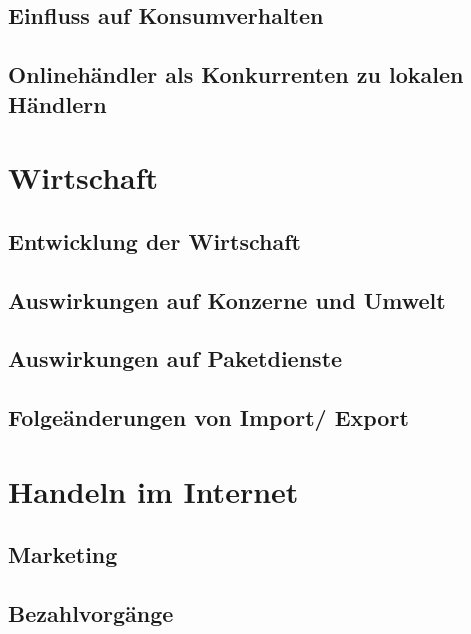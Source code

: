 \documentclass[a4paper, 12pt]{scrartcl}
\begin{document}
        \subsection{Einfluss auf Konsumverhalten }
            
            
        \subsection{Onlinehändler als Konkurrenten zu lokalen Händlern}
            
            
        
    \section{Wirtschaft}
        \subsection{Entwicklung der Wirtschaft}
        \subsection{Auswirkungen auf Konzerne und Umwelt}
        \subsection{Auswirkungen auf Paketdienste}
        \subsection{Folgeänderungen von Import/ Export}
        
    \section{Handeln im Internet}
        \subsection{Marketing}
            
        \subsection{Bezahlvorgänge}
            
        \newpage
    
    \newpage
    \listoffigures
    \newpage
    \listoftables
\end{document}
